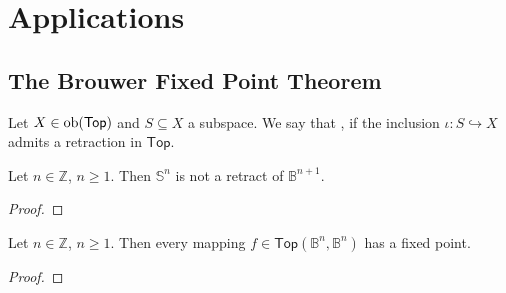 \section*{Applications}
\subsection*{The Brouwer Fixed Point Theorem}

\begin{definition}[Retract]
	Let $X \in \operatorname{ob}(\mathsf{Top})$ and $S \subseteq X$ a subspace. We say that ,  if the inclusion $\iota : S \hookrightarrow X$ admits a retraction in $\mathsf{Top}$.
\end{definition}

\begin{lemma}
	Let $n \in \mathbb{Z}$, $n \geq 1$. Then $\mathbb{S}^n$ is not a retract of $\mathbb{B}^{n + 1}$. 	
\end{lemma}

\begin{proof}
	
\end{proof}

\begin{theorem}
	Let $n \in \mathbb{Z}$, $n \geq 1$. Then every mapping $f \in \mathsf{Top}(\mathbb{B}^n,\mathbb{B}^n)$ has a fixed point.	
	\label{thm:brouwer_fixed_point}
\end{theorem}

\begin{proof}
	
\end{proof}
